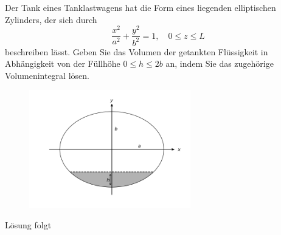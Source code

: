 \documentclass{atistandalonetask}
\begin{document}
  \begin{atiTask}[
    title = Füllung eines Tankwagens
  ]
 \begin{minipage}{0.6\textwidth}
 Der Tank eines Tanklastwagens hat die Form eines liegenden elliptischen Zylinders, der sich durch
   \[
   \frac{x^2}{a^2}+\frac{y^2}{b^2}=1,\quad 0\leq z\leq L
   \]
   beschreiben lässt. Geben Sie das Volumen der getankten Flüssigkeit in Abhängigkeit von der Füllhöhe $0\leq h\leq 2b$ an, indem Sie das zugehörige Volumenintegral lösen.
 \end{minipage} 
\begin{minipage}{0.5\textwidth}
\begin{figure}[H]
\includegraphics[width=7cm]{./picture-doppelintegral_iii}
\end{figure}
\end{minipage}  
  



  	
  \end{atiTask}
  \begin{atiSolution}
   	Lösung folgt
  \end{atiSolution}
\end{document}
